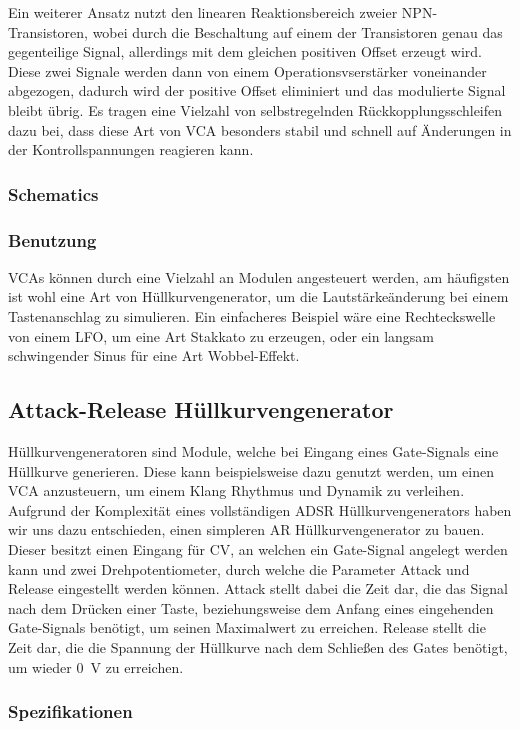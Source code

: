 Ein weiterer Ansatz nutzt den linearen Reaktionsbereich zweier NPN-Transistoren, wobei durch die Beschaltung auf einem der Transistoren genau das gegenteilige Signal, allerdings mit dem gleichen positiven Offset erzeugt wird. Diese zwei Signale werden dann von einem Operationsvserstärker voneinander abgezogen, dadurch wird der positive Offset eliminiert und das modulierte Signal bleibt übrig. Es tragen eine Vielzahl von selbstregelnden Rückkopplungsschleifen dazu bei, dass diese Art von \ac{VCA} besonders stabil und schnell auf Änderungen in der Kontrollspannungen reagieren kann.
\subsubsection{Schematics}
\label{sec:org80bf0b5}
\subsubsection{Benutzung}
\label{sec:org3481168}
\acp{VCA} können durch eine Vielzahl an Modulen angesteuert werden, am häufigsten ist wohl eine Art von Hüllkurvengenerator, um die Lautstärkeänderung bei einem Tastenanschlag zu simulieren. Ein einfacheres Beispiel wäre eine Rechteckswelle von einem LFO, um eine Art Stakkato zu erzeugen, oder ein langsam schwingender Sinus für eine Art Wobbel-Effekt.

\subsection{Attack-Release Hüllkurvengenerator}
\label{sec:orgbceed4f}
Hüllkurvengeneratoren sind Module, welche bei Eingang eines Gate-Signals eine Hüllkurve generieren. Diese kann beispielsweise dazu genutzt werden, um einen \ac{VCA} anzusteuern, um einem Klang Rhythmus und Dynamik zu verleihen. Aufgrund der Komplexität eines vollständigen \ac{ADSR} Hüllkurvengenerators haben wir uns dazu entschieden, einen simpleren \ac{AR} Hüllkurvengenerator zu bauen. Dieser besitzt einen Eingang für \acl{CV}, an welchen ein Gate-Signal angelegt werden kann und zwei Drehpotentiometer, durch welche die Parameter Attack und Release eingestellt werden können. Attack stellt dabei die Zeit dar, die das Signal nach dem Drücken einer Taste, beziehungsweise dem Anfang eines eingehenden Gate-Signals benötigt, um seinen Maximalwert zu erreichen. Release stellt die Zeit dar, die die Spannung der Hüllkurve nach dem Schließen des Gates benötigt, um wieder \SI{0}{\volt} zu erreichen.

\subsubsection{Spezifikationen}
\label{sec:orgf711fdb}
